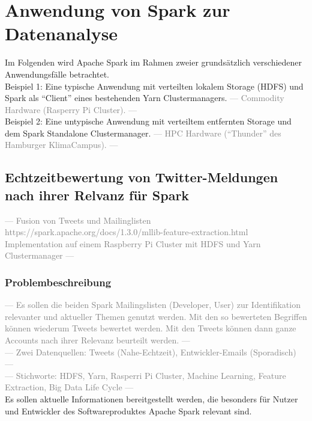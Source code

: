 \chapter{Anwendung von Spark zur Datenanalyse}
Im Folgenden wird Apache Spark im Rahmen zweier grundsätzlich verschiedener Anwendungsfälle betrachtet. \\

Beispiel 1: Eine typische Anwendung mit verteilten lokalem Storage (HDFS) und Spark als "`Client"' eines bestehenden Yarn Clustermanagers. \textcolor{gray}{--- Commodity Hardware (Rasperry Pi Cluster). ---}\\


Beispiel 2: Eine untypische Anwendung mit verteiltem entfernten Storage und dem Spark Standalone Clustermanager. \textcolor{gray}{--- HPC Hardware ("`Thunder"' des Hamburger KlimaCampus). ---}\\

\section{Echtzeitbewertung von Twitter-Meldungen nach ihrer Relvanz für Spark}
\textcolor{gray}{--- Fusion von Tweets und Mailinglisten 
https://spark.apache.org/docs/1.3.0/mllib-feature-extraction.html
Implementation auf einem Raspberry Pi Cluster mit HDFS und Yarn Clustermanager ---}\\
\subsection{Problembeschreibung}
\textcolor{gray}{--- Es sollen die beiden Spark Mailingslisten (Developer, User) zur Identifikation relevanter und aktueller Themen genutzt werden. Mit den so bewerteten Begriffen können wiederum Tweets bewertet werden. Mit den Tweets können dann ganze Accounts nach ihrer Relevanz beurteilt werden. ---}\\
\textcolor{gray}{--- Zwei Datenquellen: Tweets (Nahe-Echtzeit), Entwickler-Emails (Sporadisch) ---}\\
\textcolor{gray}{--- Stichworte: HDFS, Yarn, Rasperri Pi Cluster, Machine Learning, Feature Extraction, Big Data Life Cycle ---}\\

Es sollen aktuelle Informationen bereitgestellt werden, die besonders für Nutzer und Entwickler des Softwareproduktes Apache Spark relevant sind.\\



